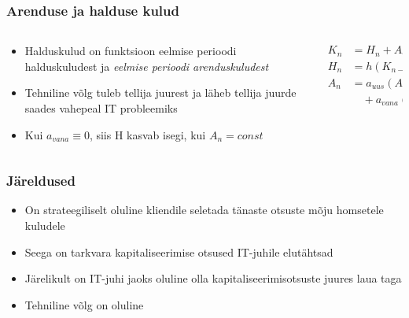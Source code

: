 \begin{frame}[fragile]
  \frametitle{Arenduse ja halduse kulud}
  	\begin{columns}[t]
		\begin{column}[T]{6.5cm}
			\begin{itemize}
				\item Halduskulud on funktsioon eelmise perioodi halduskuludest ja \emph{eelmise perioodi arenduskuludest}
				\item Tehniline võlg tuleb tellija juurest ja läheb tellija juurde saades vahepeal IT probleemiks
				\item Kui $a_{vana}\equiv0$, siis H kasvab isegi, kui $A_n=const$
			\end{itemize}
		\end{column}
		\begin{column}[T]{3.5cm}
			\begin{align}
				K_n &= H_n+A_n \nonumber \\
			    H_n &= h(K_{n-1}) \nonumber\\
			    A_n &= a_{uus}(A_{n-1}) \nonumber \\
			    &\quad {} + a_{vana}(A_{n-1}) \nonumber
		    \end{align}
		\end{column}
	\end{columns}
\end{frame}

\begin{frame}[fragile]
  \frametitle{Järeldused}
	\begin{itemize}
		\item On strateegiliselt oluline kliendile seletada tänaste otsuste mõju homsetele kuludele
		\item Seega on tarkvara kapitaliseerimise otsused IT-juhile elutähtsad
		\item Järelikult on IT-juhi jaoks oluline olla kapitaliseerimisotsuste juures laua taga
		\item Tehniline võlg on oluline
	\end{itemize}
\end{frame}


